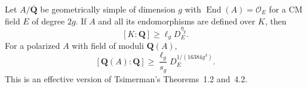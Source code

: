 \begin{theorem}
\label{NC03}
Let $A/\overline{\mathbf Q}$ be geometrically simple of dimension $g$
with $\operatorname{End}(A)=\mathcal O_E$ for a CM field $E$ of degree
$2g$.  If $A$ and all its endomorphisms are defined over $K$, then
\begin{equation}\label{eq:NC03-def}
 [K:\mathbf Q]\geq\ell_g D_E^{\eta_g}.
\end{equation}
For a polarized $A$ with field of moduli $\mathbf Q(A)$,
\begin{equation}\label{eq:NC03-moduli}
 [\mathbf Q(A):\mathbf Q]\geq
 \frac{\ell_g}{s_g}D_E^{1/(16384g^3)}.
\end{equation}
This is an effective version of Tsimerman's Theorems~1.2 and~4.2.
\end{theorem}

